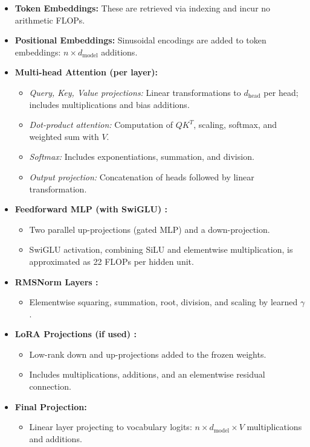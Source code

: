 \documentclass[a4paper,12pt]{article}
\begin{document}
\begin{itemize}
  \item \textbf{Token Embeddings:} These are retrieved via indexing and incur no arithmetic FLOPs.
  
  \item \textbf{Positional Embeddings:} Sinusoidal encodings are added to token embeddings: $n \times d_{\text{model}}$ additions.

  \item \textbf{Multi-head Attention (per layer):}
  \begin{itemize}
    \item \textit{Query, Key, Value projections:} Linear transformations to $d_{\text{head}}$ per head; includes multiplications and bias additions.
    \item \textit{Dot-product attention:} Computation of $QK^T$, scaling, softmax, and weighted sum with $V$.
    \item \textit{Softmax:} Includes exponentiations, summation, and division.
    \item \textit{Output projection:} Concatenation of heads followed by linear transformation.
  \end{itemize}

  \item \textbf{Feedforward MLP (with SwiGLU) \citep{shazeer2020glu}:}
  \begin{itemize}
    \item Two parallel up-projections (gated MLP) and a down-projection.
    \item SwiGLU activation, combining SiLU and elementwise multiplication, is approximated as 22 FLOPs per hidden unit.
  \end{itemize}

  \item \textbf{RMSNorm Layers \citep{zhang2019root}:}
  \begin{itemize}
    \item Elementwise squaring, summation, root, division, and scaling by learned $\gamma$.
  \end{itemize}

  \item \textbf{LoRA Projections (if used) \citep{hu2021lora}:}
  \begin{itemize}
    \item Low-rank down and up-projections added to the frozen weights.
    \item Includes multiplications, additions, and an elementwise residual connection.
  \end{itemize}

  \item \textbf{Final Projection:}
  \begin{itemize}
    \item Linear layer projecting to vocabulary logits: $n \times d_{\text{model}} \times V$ multiplications and additions.
  \end{itemize}
\end{itemize}
\end{document}
